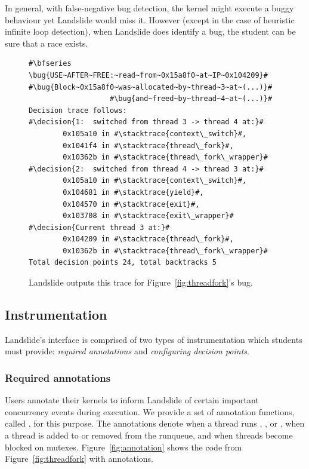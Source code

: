 In general, with false-negative bug detection, the kernel might execute a buggy behaviour yet Landslide would miss it. However (except in the case of heuristic infinite loop detection), when Landslide does identify a bug, the student can be sure that a race exists.

\newcommand\bug[1]{\hilight{red}{#1}}
\newcommand\decision[1]{\bfseries \hilight{olivegreen}{#1}}
\newcommand\stacktrace[1]{\hilight{darkcyan}{#1}}
\begin{figure}[t]
\begin{lstlisting}
#\bfseries \bug{USE~AFTER~FREE:~read~from~0x15a8f0~at~IP~0x104209}#
#\bug{Block~0x15a8f0~was~allocated~by~thread~3~at~(...)}#
                   #\bug{and~freed~by~thread~4~at~(...)}#
Decision trace follows:
#\decision{1:  switched from thread 3 -> thread 4 at:}#
        0x105a10 in #\stacktrace{context\_switch}#,
        0x1041f4 in #\stacktrace{thread\_fork}#,
        0x10362b in #\stacktrace{thread\_fork\_wrapper}#
#\decision{2:  switched from thread 4 -> thread 3 at:}#
        0x105a10 in #\stacktrace{context\_switch}#,
        0x104681 in #\stacktrace{yield}#,
        0x104570 in #\stacktrace{exit}#,
        0x103708 in #\stacktrace{exit\_wrapper}#
#\decision{Current thread 3 at:}#
        0x104209 in #\stacktrace{thread\_fork}#,
        0x10362b in #\stacktrace{thread\_fork\_wrapper}#
Total decision points 24, total backtracks 5
\end{lstlisting}
\caption{Landslide outputs this trace for Figure~\ref{fig:threadfork}'s bug.}
\label{fig:trace}
\end{figure}

\subsection{Instrumentation}
\label{sec:instrument}

Landslide's interface is comprised of two types of instrumentation which students must provide: {\em required annotations} and {\em configuring decision points}.

\subsubsection{Required annotations}
Users annotate their kernels to inform Landslide of certain important concurrency events during execution. We provide a set of annotation functions, called , for this purpose. The annotations denote when a thread runs , , or , when a thread is added to or removed from the runqueue, and when threads become blocked on mutexes.
Figure~\ref{fig:annotation} shows the code from Figure~\ref{fig:threadfork} with  annotations.

